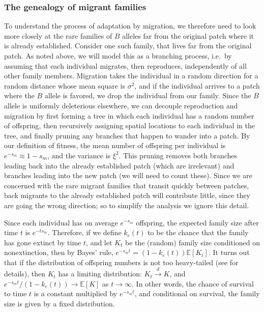 \documentclass{article}
\newcommand{\citet}[1]{\cite{#1}}
\newcommand{\E}{\mathbb{E}}
\newcommand{\dconv}{\xrightarrow{d}}
\begin{document}
\subsubsection{The genealogy of migrant families}

To understand the process of adaptation by migration,
we therefore need to look more closely at the rare families of $B$ alleles 
far from the original patch where it is already established.
Consider one such family,
that lives far from the original patch.
As noted above, we will model this as a branching process,
i.e.\ by assuming that each individual
migrates, then reproduces, independently of all other family members.
Migration takes the individual in a random direction
for a random distance whose mean square is $\sigma^2$,
and if the individual arrives to a patch where the $B$ allele is favored, 
we drop the individual from our family.
Since the $B$ allele is uniformly deleterious elsewhere,
we can decouple reproduction and migration
by first forming a tree in which each individual has a random number of offspring,
then recursively assigning spatial locations to each individual in the tree,
and finally pruning any branches that happen to wander into a patch.
By our definition of fitness, the mean number of offspring per individual is $e^{-s_m}\approx 1-s_m$,
and the variance is $\xi^2$.
This pruning removes both branches leading back into the already established patch (which are irrelevant)
and branches leading into the new patch (we will need to count these).
Since we are concerned with the rare migrant families that transit quickly between patches, 
back migrants to the already established patch will contribute little, since they are going the wrong direction;
so to simplify the analysis we ignore this detail.  %

Since each individual has on average $e^{-s_m}$ offspring,
the expected family size after time $t$ is $e^{- t s_m}$.
Therefore, if we define $k_e(t)$ to be the chance that the family
has gone extinct by time $t$, 
and let $K_t$ be the (random) family size conditioned on nonextinction,
then by Bayes' rule, $e^{-s_m t} = (1-k_e(t))\E[K_t]$.
It turns out that if the distribution of offspring numbers is not too heavy-tailed (see \citet{jagers1975branching} for details),
then $K_t$ has a limiting distribution: $K_t \dconv K$,
and $e^{-s_m t}/(1-k_e(t)) \to \E[K]$ as $t \to \infty$.
In other words, the chance of survival to time $t$ is a constant multiplied by $e^{-s_m t}$,
and conditional on survival, the family size is given by a fixed distribution.
\end{document}
